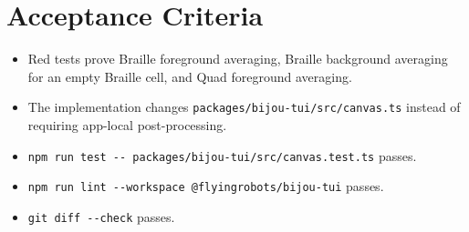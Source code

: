 \section{Acceptance Criteria}\label{record-158-acceptance-criteria}

\begin{itemize}
\tightlist
\item
  Red tests prove Braille foreground averaging, Braille background averaging for an empty Braille cell, and Quad foreground averaging.
\item
  The implementation changes \texttt{p\allowbreak{}a\allowbreak{}c\allowbreak{}k\allowbreak{}a\allowbreak{}g\allowbreak{}e\allowbreak{}s\allowbreak{}/\allowbreak{}b\allowbreak{}i\allowbreak{}j\allowbreak{}o\allowbreak{}u\allowbreak{}-\allowbreak{}t\allowbreak{}u\allowbreak{}i\allowbreak{}/\allowbreak{}s\allowbreak{}r\allowbreak{}c\allowbreak{}/\allowbreak{}c\allowbreak{}a\allowbreak{}n\allowbreak{}v\allowbreak{}a\allowbreak{}s\allowbreak{}.\allowbreak{}t\allowbreak{}s} instead of requiring app-local post-processing.
\item
  \texttt{n\allowbreak{}p\allowbreak{}m\allowbreak{} \allowbreak{}r\allowbreak{}u\allowbreak{}n\allowbreak{} \allowbreak{}t\allowbreak{}e\allowbreak{}s\allowbreak{}t\allowbreak{} \allowbreak{}-\allowbreak{}-\allowbreak{} \allowbreak{}p\allowbreak{}a\allowbreak{}c\allowbreak{}k\allowbreak{}a\allowbreak{}g\allowbreak{}e\allowbreak{}s\allowbreak{}/\allowbreak{}b\allowbreak{}i\allowbreak{}j\allowbreak{}o\allowbreak{}u\allowbreak{}-\allowbreak{}t\allowbreak{}u\allowbreak{}i\allowbreak{}/\allowbreak{}s\allowbreak{}r\allowbreak{}c\allowbreak{}/\allowbreak{}c\allowbreak{}a\allowbreak{}n\allowbreak{}v\allowbreak{}a\allowbreak{}s\allowbreak{}.\allowbreak{}t\allowbreak{}e\allowbreak{}s\allowbreak{}t\allowbreak{}.\allowbreak{}t\allowbreak{}s} passes.
\item
  \texttt{n\allowbreak{}p\allowbreak{}m\allowbreak{} \allowbreak{}r\allowbreak{}u\allowbreak{}n\allowbreak{} \allowbreak{}l\allowbreak{}i\allowbreak{}n\allowbreak{}t\allowbreak{} \allowbreak{}-\allowbreak{}-\allowbreak{}w\allowbreak{}o\allowbreak{}r\allowbreak{}k\allowbreak{}s\allowbreak{}p\allowbreak{}a\allowbreak{}c\allowbreak{}e\allowbreak{} \allowbreak{}@\allowbreak{}f\allowbreak{}l\allowbreak{}y\allowbreak{}i\allowbreak{}n\allowbreak{}g\allowbreak{}r\allowbreak{}o\allowbreak{}b\allowbreak{}o\allowbreak{}t\allowbreak{}s\allowbreak{}/\allowbreak{}b\allowbreak{}i\allowbreak{}j\allowbreak{}o\allowbreak{}u\allowbreak{}-\allowbreak{}t\allowbreak{}u\allowbreak{}i} passes.
\item
  \texttt{g\allowbreak{}i\allowbreak{}t\allowbreak{} \allowbreak{}d\allowbreak{}i\allowbreak{}f\allowbreak{}f\allowbreak{} \allowbreak{}-\allowbreak{}-\allowbreak{}c\allowbreak{}h\allowbreak{}e\allowbreak{}c\allowbreak{}k} passes.
\end{itemize}

